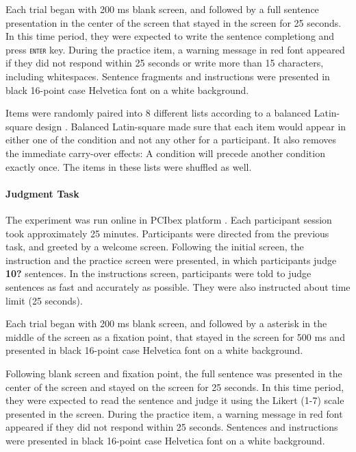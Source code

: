 \documentclass[
  10pt,
  letterpaper,
  DIV=11,
  numbers=noendperiod]{scrartcl}
\let\oldparagraph\paragraph
\renewcommand{\paragraph}[1]{\oldparagraph{#1}\mbox{}}
\begin{document}
Each trial began with 200 ms blank screen, and followed by a full
sentence presentation in the center of the screen that stayed in the
screen for 25 seconds. In this time period, they were expected to write
the sentence completiong and press \texttt{\textsc{enter}} key. During
the practice item, a warning message in red font appeared if they did
not respond within 25 seconds or write more than 15 characters,
including whitespaces. Sentence fragments and instructions were
presented in black 16-point case Helvetica font on a white background.

Items were randomly paired into 8 different lists according to a
balanced Latin-square design \autocite{Bradley1958}. Balanced
Latin-square made sure that each item would appear in either one of the
condition and not any other for a participant. It also removes the
immediate carry-over effects: A condition will precede another condition
exactly once. The items in these lists were shuffled as well.

\hypertarget{judgment-task-1}{%
\paragraph{Judgment Task}\label{judgment-task-1}}

The experiment was run online in PCIbex platform
\autocite{Drummond2013,ZehrSchwarz2018}. Each participant session took
approximately 25 minutes. Participants were directed from the previous
task, and greeted by a welcome screen. Following the initial screen, the
instruction and the practice screen were presented, in which
participants judge \textbf{10?} sentences. In the instructions screen,
participants were told to judge sentences as fast and accurately as
possible. They were also instructed about time limit (25 seconds).

Each trial began with 200 ms blank screen, and followed by a asterisk in
the middle of the screen as a fixation point, that stayed in the screen
for 500 ms and presented in black 16-point case Helvetica font on a
white background.

Following blank screen and fixation point, the full sentence was
presented in the center of the screen and stayed on the screen for 25
seconds. In this time period, they were expected to read the sentence
and judge it using the Likert (1-7) scale presented in the screen.
During the practice item, a warning message in red font appeared if they
did not respond within 25 seconds. Sentences and instructions were
presented in black 16-point case Helvetica font on a white background.
\end{document}
